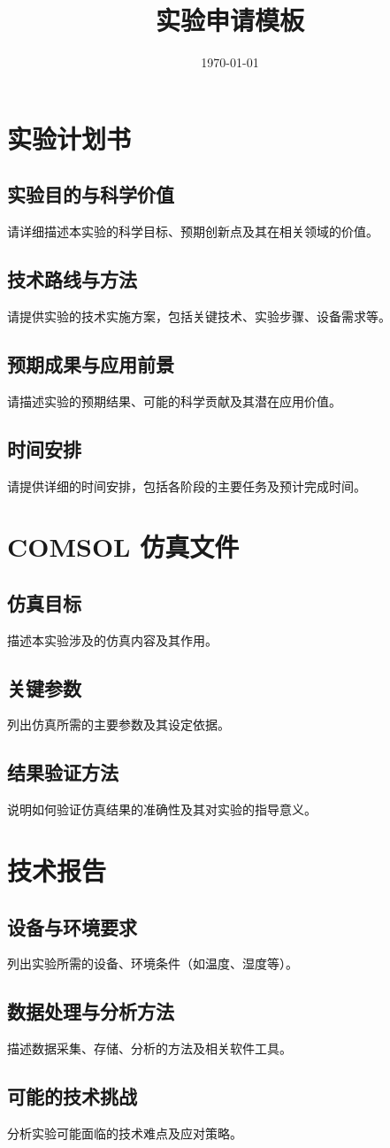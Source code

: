 \documentclass[12pt]{article}
\title{\textbf{实验申请模板}}
\author{}
\date{\today}
\begin{document}
\maketitle

\section{实验计划书}

\subsection{实验目的与科学价值}
请详细描述本实验的科学目标、预期创新点及其在相关领域的价值。

\subsection{技术路线与方法}
请提供实验的技术实施方案，包括关键技术、实验步骤、设备需求等。

\subsection{预期成果与应用前景}
请描述实验的预期结果、可能的科学贡献及其潜在应用价值。

\subsection{时间安排}
请提供详细的时间安排，包括各阶段的主要任务及预计完成时间。

\section{COMSOL 仿真文件}

\subsection{仿真目标}
描述本实验涉及的仿真内容及其作用。

\subsection{关键参数}
列出仿真所需的主要参数及其设定依据。

\subsection{结果验证方法}
说明如何验证仿真结果的准确性及其对实验的指导意义。

\section{技术报告}

\subsection{设备与环境要求}
列出实验所需的设备、环境条件（如温度、湿度等）。

\subsection{数据处理与分析方法}
描述数据采集、存储、分析的方法及相关软件工具。

\subsection{可能的技术挑战}
分析实验可能面临的技术难点及应对策略。
\end{document}
